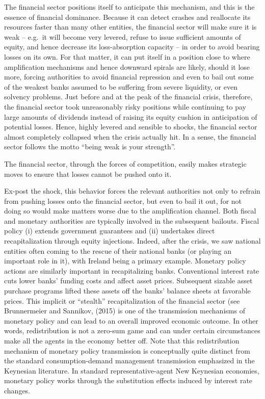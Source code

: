 \documentclass[
]{book}
\begin{document}
The financial sector positions itself to anticipate this
mechanism, and this is the essence of financial dominance.
Because it can detect crashes and reallocate its resources faster
than many other entities, the financial sector will make sure it is
weak -- e.g.~it will become very levered, refuse to issue sufficient
amounts of equity, and hence decrease its loss-absorption
capacity -- in order to avoid bearing losses on its own. For that
matter, it can put itself in a position close to where amplification
mechanisms and hence downward spirals are likely, should it
lose more, forcing authorities to avoid financial repression
and even to bail out some of the weakest banks assumed to
be suffering from severe liquidity, or even solvency problems.
Just before and at the peak of the financial crisis, therefore,
the financial sector took unreasonably risky positions while
continuing to pay large amounts of dividends instead of
raising its equity cushion in anticipation of potential losses.
Hence, highly levered and sensible to shocks, the financial
sector almost completely collapsed when the crisis actually
hit. In a sense, the financial sector follows the
motto ``being weak is your strength''.

The financial sector, through the forces of competition, easily makes
strategic moves to ensure that losses cannot be pushed onto it.

Ex-post the shock, this behavior forces the relevant
authorities not only to refrain from pushing losses onto
the financial sector, but even to bail it out, for not doing
so would make matters worse due to the amplification
channel. Both fiscal and monetary authorities are typically
involved in the subsequent bailouts. Fiscal policy (i)
extends government guarantees and (ii) undertakes direct
recapitalization through equity injections. Indeed, after the
crisis, we saw national entities often coming to the rescue of
their national banks (or playing an important role in it),
with Ireland being a primary example.
Monetary policy actions are similarly important in
recapitalizing banks. Conventional interest rate cuts lower
banks' funding costs and affect asset prices. Subsequent
sizable asset purchase programs lifted these assets off the
banks' balance sheets at favorable prices. This implicit
or ``stealth'' recapitalization of the financial sector
(see Brunnermeier and Sannikov, (2015) is one of the
transmission mechanisms of monetary policy and can lead
to an overall improved economic outcome. In other words,
redistribution is not a zero-sum game and can under certain
circumstances make all the agents in the economy better
off. Note that this redistribution mechanism of monetary
policy transmission is conceptually quite distinct from the
standard consumption-demand management transmission
emphasized in the Keynesian literature. In standard
representative-agent New Keynesian economies, monetary
policy works through the substitution effects induced by
interest rate changes.
\end{document}
